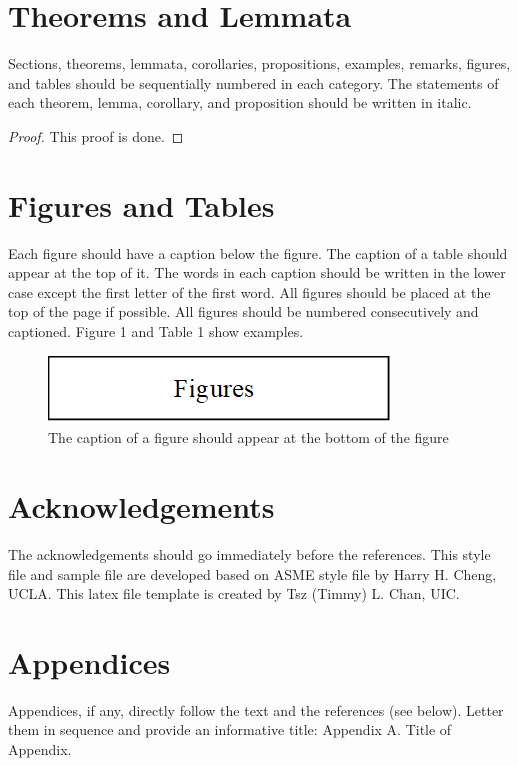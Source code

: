 \documentclass{article}
\begin{document}
\section{Theorems and Lemmata}

\begin{theorem}
Sections, theorems, lemmata, corollaries, propositions, examples, remarks, figures, and tables should be sequentially numbered in each category. The statements of each theorem, lemma, corollary, and proposition should be written in italic.
\end{theorem}

\begin{proof}
This proof is done.
\end{proof}

\section{Figures and Tables}
Each figure should have a caption below the figure. The caption of a table should appear at the top of it. The words in each caption should be written in the lower case except the first letter of the first word. All figures should be placed at the top of the page if possible. All figures should be numbered consecutively and captioned. Figure 1 and Table 1 show examples.

\begin{figure}[H]
\centering
\includegraphics[width=.5\columnwidth]{figure}
\caption{The caption of a figure should appear at the bottom of the figure}
\end{figure}
\section*{Acknowledgements}
The acknowledgements should go immediately before the references. This style file and sample file are developed based on ASME style file by Harry H. Cheng, UCLA. This latex file template is created by Tsz (Timmy) L. Chan, UIC.


\appendix
\section*{Appendices}
Appendices, if any, directly follow the text and the references (see below). Letter them in sequence and provide an informative title: Appendix A. Title of Appendix. 
\end{document}
